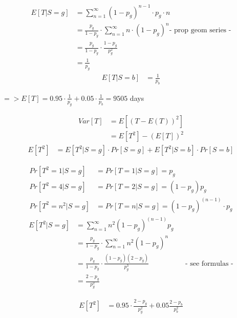\begin{align*}
E\left[T|S=g\right]&=\sum _{{n=1}}^{\infty}\left(1-p_{g}\right)^{{n-1}}\cdot p_{g}\cdot n\\
&=\frac{p_{g}}{1-p_{g}}\cdot \sum _{{n=1}}^{\infty}n\cdot \left(1-p_{g}\right)^{n} \text{-  prop geom series -}\\ 
&=\frac{p_{g}}{1-p_{g}}\cdot \frac{1-p_{g}}{p_{g}^{2}}\\
&=\frac{1}{p_g}
\end{align*}
\begin{align*}
E\left[T|S=b\right]&=\frac{1}{p_{b}}
\end{align*}

$=> E\left[T\right]=0.95\cdot \frac{1}{p_{g}}+0.05\cdot \frac{1}{p_{b}}=9505$ days

\begin{align*}
Var\left[T\right]&=E\left[\left(T-E\left(T\right)\right)^{2}\right]\\
&=E\left[T^{2}\right]-\left(E\left[T\right]\right)^{2}
\end{align*}
\begin{align*}
E\left[T^{2}\right]&=E\left[T^{2}|S=g\right]\cdot Pr\left[S=g\right]+E\left[T^{2}|S=b\right]\cdot Pr\left[S=b\right]
\end{align*}


\begin{align*}
Pr\left[T^{2}=1|S=g\right]&=Pr\left[T=1|S=g\right]=p_{g}\\
Pr\left[T^{2}=4|S=g\right]&=Pr\left[T=2|S=g\right]=\left(1-p_{g}\right)p_{g}\\
Pr\left[T^{2}=n^{2}|S=g\right]&=Pr\left[T=n|S=g\right]=\left(1-p_{g}\right)^{\left(n-1\right)}\cdot p_{g}
\end{align*}
\begin{align*}
E\left[T^{2}|S=g\right]&=\sum _{{n=1}}^{\infty }n^{2}\left(1-p_{g}\right)^{\left(n-1\right)}p_{g}\\
&=\frac{p_{g}}{1-p_{g}}\cdot \sum _{{n=1}}^{\infty }n^{2}\left(1-p_{g}\right)^{n}\\
&=\frac{p_{g}}{1-p_{g}}\cdot \frac{\left(1-p_{g}\right)\left(2-p_{g}\right)}{p_{g}^{3}}&& \text{-  see formulas -}\\
&=\frac{2-p_{g}}{p_{g}^{2}}
\end{align*}

\begin{align*}
E\left[T^{2}\right]&=0.95\cdot \frac{2-p_{g}}{p_{g}^{2}}+0.05\frac{2-p_{b}}{p_{b}^{2}}
\end{align*}

